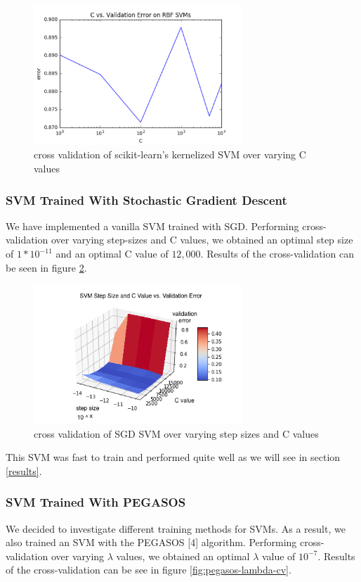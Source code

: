 \documentclass{article} %
\begin{document}
\begin{figure}[h]
\centering
\includegraphics[width=0.7\textwidth]{sklearn-svm-kernel-c-cv.png}
\caption{cross validation of scikit-learn's kernelized SVM over varying C values}
\label{fig:sklearn-svm-kernel-c-cv}
\end{figure}

\subsubsection{SVM Trained With Stochastic Gradient Descent}
We have implemented a vanilla SVM trained with SGD. Performing cross-validation
over varying step-sizes and C values, we obtained an optimal step size of $1 *
10^{-11}$ and an optimal C value of $12,000$. Results of the cross-validation
can be seen in figure \ref{fig:svm-step-C-cv}.

\begin{figure}[h]
\centering
\includegraphics[width=0.7\textwidth]{svm-step-C-cv.png}
\caption{cross validation of SGD SVM over varying step sizes and C values}
\label{fig:svm-step-C-cv}
\end{figure}

This SVM was fast to train and performed quite well as we will see in section \ref{results}.

\subsubsection{SVM Trained With PEGASOS}
We decided to investigate different training methods for SVMs. As a result, we
also trained an SVM with the PEGASOS [4] algorithm. Performing cross-validation
over varying $\lambda$ values, we obtained an optimal $\lambda$ value of
$10^{-7}$. Results of the cross-validation can be see in figure \ref{fig:pegasos-lambda-cv}.
\end{document}
